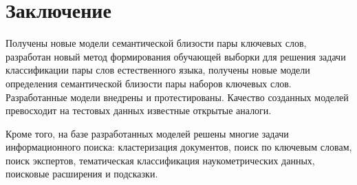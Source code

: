 \chapter*{Заключение}						%


Получены новые модели семантической близости пары ключевых слов, разработан новый метод формирования обучающей выборки для решения задачи классификации пары слов естественного языка, получены новые модели определения семантической близости пары наборов ключевых слов. Разработанные модели внедрены и протестированы. Качество созданных моделей превосходит на тестовых данных известные открытые аналоги.

Кроме того, на базе разработанных моделей решены многие задачи информационного поиска: кластеризация документов, поиск по ключевым словам, поиск экспертов, тематическая классификация наукометрических данных, поисковые расширения и подсказки.


